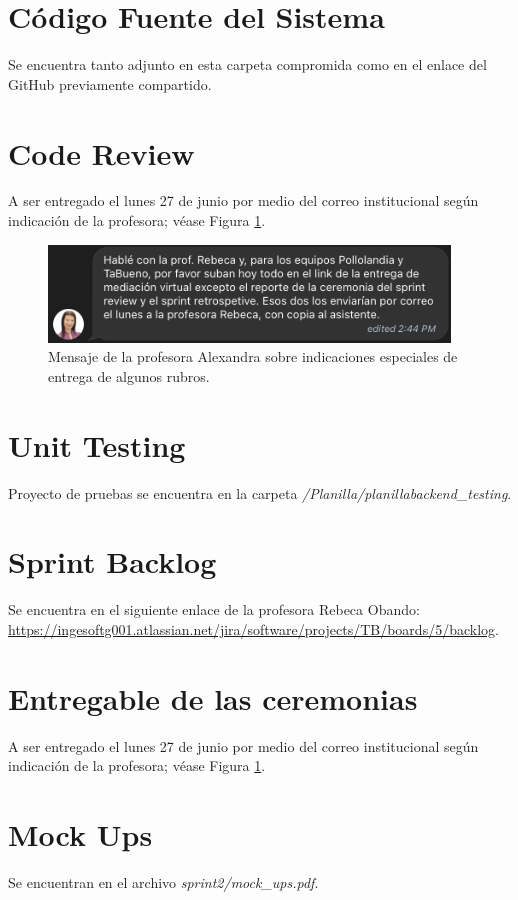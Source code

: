 \documentclass{article}
\begin{document}
%

\section{Código Fuente del Sistema}
Se encuentra tanto adjunto en esta carpeta compromida como en el enlace del GitHub
previamente compartido.

\section{Code Review}
A ser entregado el lunes 27 de junio por medio del correo institucional según
indicación de la profesora; véase Figura \ref{fig:message}.

\begin{figure}[h]
 \centering
 \includegraphics[width=0.95\textwidth]{message.png}
 \caption{Mensaje de la profesora Alexandra sobre indicaciones especiales de entrega de algunos rubros.}
 \label{fig:message}
\end{figure}

\section{Unit Testing}
Proyecto de pruebas se encuentra en la carpeta \textit{/Planilla/planilla\-backend\_testing}.

\section{Sprint Backlog}
Se encuentra en el siguiente enlace de la profesora Rebeca Obando: \url{https://ingesoftg001.atlassian.net/jira/software/projects/TB/boards/5/backlog}.

\section{Entregable de las ceremonias}
A ser entregado el lunes 27 de junio por medio del correo institucional según
indicación de la profesora; véase Figura \ref{fig:message}.

\section{Mock Ups}
Se encuentran en el archivo \textit{sprint2/mock\_ups.pdf}.
\end{document}
